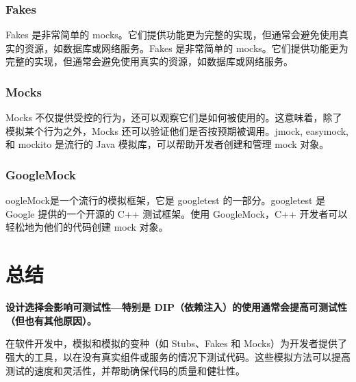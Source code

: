 \subsubsection{Fakes}
Fakes 是非常简单的 mocks。它们提供功能更为完整的实现，但通常会避免使用真实的资源，如数据库或网络服务。Fakes 是非常简单的 mocks。它们提供功能更为完整的实现，但通常会避免使用真实的资源，如数据库或网络服务。

\subsubsection{Mocks}
Mocks 不仅提供受控的行为，还可以观察它们是如何被使用的。这意味着，除了模拟某个行为之外，Mocks 还可以验证他们是否按预期被调用。jmock, easymock, 和 mockito 是流行的 Java 模拟库，可以帮助开发者创建和管理 mock 对象。

\subsubsection{GoogleMock}
oogleMock是一个流行的模拟框架，它是 googletest 的一部分。googletest 是 Google 提供的一个开源的 C++ 测试框架。使用 GoogleMock，C++ 开发者可以轻松地为他们的代码创建 mock 对象。

\section{总结}
\textbf{设计选择会影响可测试性---特别是 DIP（依赖注入）的使用通常会提高可测试性（但也有其他原因）。}

在软件开发中，模拟和模拟的变种（如 Stubs、Fakes 和 Mocks）为开发者提供了强大的工具，以在没有真实组件或服务的情况下测试代码。这些模拟方法可以提高测试的速度和灵活性，并帮助确保代码的质量和健壮性。